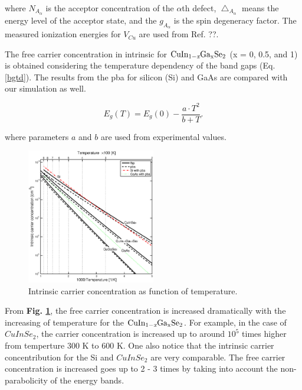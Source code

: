 \documentclass[a4paper, 12pt, titlepage,oneside,drop]{kthesis}
\begin{document}
where $N_{A_{\alpha}}$ is the acceptor concentration of the $\alpha$th defect, $\bigtriangleup_{A_{\alpha}}$ means the energy level of the acceptor state, and the $g_{A_{\alpha}}$
 is the spin degeneracy factor. The measured ionization energies for $V_{Cu}$ are used from Ref. ??.

The free carrier concentration in intrinsic for $\mathrm { CuIn_{1-\textit{x}}Ga_{x}Se_2}$ (x = 0, 0.5, and 1) is obtained considering the temperature dependency of the band gaps (Eq. \ref{bgtd}).
The results from the pba for silicon (Si) and GaAs are compared with our simulation as well.

\begin{equation}\label{bgtd}
 E_g(T) = E_g(0) - \frac{a \cdot T^2}{b+T}.
\end{equation}

where parameters $a$ and $b$ are used from experimental values.

 \begin{figure}[H]
    \begin{center}
            \includegraphics[width=0.5\textwidth,clip]{figure7b_1}
     \end{center}
    \caption{Intrinsic carrier concentration as function of temperature.}
   \label{icc}
\end{figure}

From \textbf{Fig. \ref{icc}}, the free carrier concentration is increased dramatically with the increasing of temperature for the $\mathrm { CuIn_{1-\textit{x}}Ga_{x}Se_2}$. For example, in the case of $CuInSe_2$, the carrier concentration is
increased up to around $10^{5}$ times higher from temperture 300 K to 600 K. One also notice that the intrinsic carrier concentribution for the Si and $CuInSe_2$ are very comparable. The free carrier concentration is increased 
goes up to 2 - 3 times by taking into account the non-parabolicity of the energy bands. 
\end{document}
